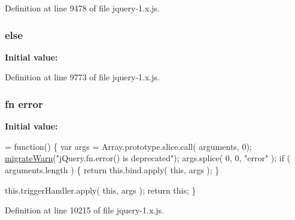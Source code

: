 Definition at line 9478 of file jquery-\/1.\+x.\+js.

\subsubsection[{\texorpdfstring{else}{else}}]{\setlength{\rightskip}{0pt plus 5cm}else}\hypertarget{jquery-1_8x_8js_a0544c3fe466e421738dae463968b70ba}{}\label{jquery-1_8x_8js_a0544c3fe466e421738dae463968b70ba}
{\bfseries Initial value\+:}


Definition at line 9773 of file jquery-\/1.\+x.\+js.

\subsubsection[{\texorpdfstring{error}{error}}]{ {\bf fn} error}\hypertarget{jquery-1_8x_8js_ad9c7b7332a24ed93fb21cd053c99bd12}{}\label{jquery-1_8x_8js_ad9c7b7332a24ed93fb21cd053c99bd12}
{\bfseries Initial value\+:}
\begin{DoxyCode}
= \textcolor{keyword}{function}() \{
    var args = Array.prototype.slice.call( arguments, 0);
    \hyperlink{jquery-1_8x_8js_ac6036b3100bb484f96bfb15165e077f9}{migrateWarn}(\textcolor{stringliteral}{"jQuery.fn.error() is deprecated"});
    args.splice( 0, 0, \textcolor{stringliteral}{"error"} );
    \textcolor{keywordflow}{if} ( arguments.length ) \{
        \textcolor{keywordflow}{return} this.bind.apply( \textcolor{keyword}{this}, args );
    \}
    
    this.triggerHandler.apply( \textcolor{keyword}{this}, args );
    \textcolor{keywordflow}{return} \textcolor{keyword}{this};
\}
\end{DoxyCode}


Definition at line 10215 of file jquery-\/1.\+x.\+js.

